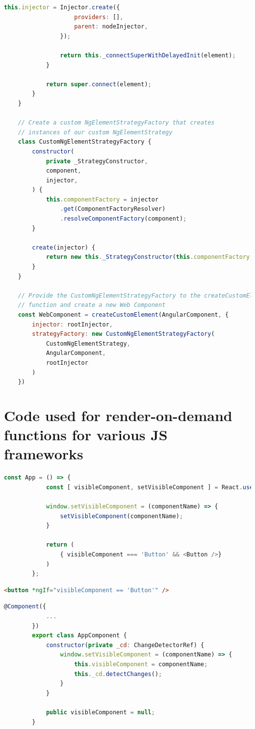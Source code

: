 \begin{lstlisting}[language={JavaScript},caption={The code for creating a Hierarchical Injector in an Angular Elements component},label={lst:appendix:hierarchical-injectors}]
				this.injector = Injector.create({
					providers: [],
					parent: nodeInjector,
				});
	
				return this._connectSuperWithDelayedInit(element);
			}
	
			return super.connect(element);
		}
	}
	
	// Create a custom NgElementStrategyFactory that creates
	// instances of our custom NgElementStrategy
	class CustomNgElementStrategyFactory {
		constructor(
			private _StrategyConstructor,
			component,
			injector,
		) {
			this.componentFactory = injector
				.get(ComponentFactoryResolver)
				.resolveComponentFactory(component);
		}
	
		create(injector) {
			return new this._StrategyConstructor(this.componentFactory, injector);
		}
	}
	
	// Provide the CustomNgElementStrategyFactory to the createCustomElement
	// function and create a new Web Component
	const WebComponent = createCustomElement(AngularComponent, {
		injector: rootInjector,
		strategyFactory: new CustomNgElementStrategyFactory(
			CustomNgElementStrategy,
			AngularComponent,
			rootInjector
		)
	})
		\end{lstlisting}

\section{Code used for render-on-demand functions for various JS frameworks}

\begin{lstlisting}[language={JavaScript},caption={The render-on-demand function in ReactJS},label={lst:appendix:react-set-visible}]
		const App = () => {
			const [ visibleComponent, setVisibleComponent ] = React.useState(null);
		
			window.setVisibleComponent = (componentName) => {
				setVisibleComponent(componentName);
			}
		
			return (
				{ visibleComponent === 'Button' && <Button />}
			)
		};
		\end{lstlisting}

\begin{lstlisting}[language={HTML},caption={The render-on-demand function in Angular (HTML file)},label={lst:appendix:angular-set-visible-html}]
		<button *ngIf="visibleComponent == 'Button'" />
		\end{lstlisting}

\begin{lstlisting}[language={JavaScript},caption={The render-on-demand function in Angular (JavaScript file)},label={lst:appendix:angular-set-visible-js}]
		@Component({
			...
		})
		export class AppComponent {
			constructor(private _cd: ChangeDetectorRef) {
				window.setVisibleComponent = (componentName) => {
					this.visibleComponent = componentName;
					this._cd.detectChanges();
				}
			}
		
			public visibleComponent = null;
		}
		\end{lstlisting}


